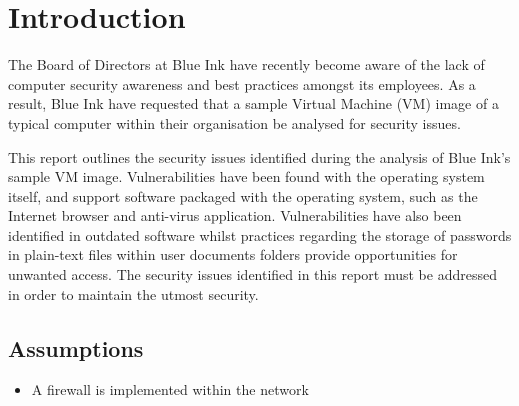\section{Introduction}

The Board of Directors at Blue Ink have recently become aware of the lack of computer security awareness and best practices amongst its employees. As a result, Blue Ink have requested that a sample Virtual Machine (VM) image of a typical computer within their organisation be analysed for security issues.

This report outlines the security issues identified during the analysis of Blue Ink's sample VM image. Vulnerabilities have been found with the operating system itself, and support software packaged with the operating system, such as the Internet browser and anti-virus application. Vulnerabilities have also been identified in outdated software whilst practices regarding the storage of passwords in plain-text files within user documents folders provide opportunities for unwanted access. The security issues identified in this report must be addressed in order to maintain the utmost security.

\subsection{Assumptions}

\begin{itemize}
\item A firewall is implemented within the network
\end{itemize}
